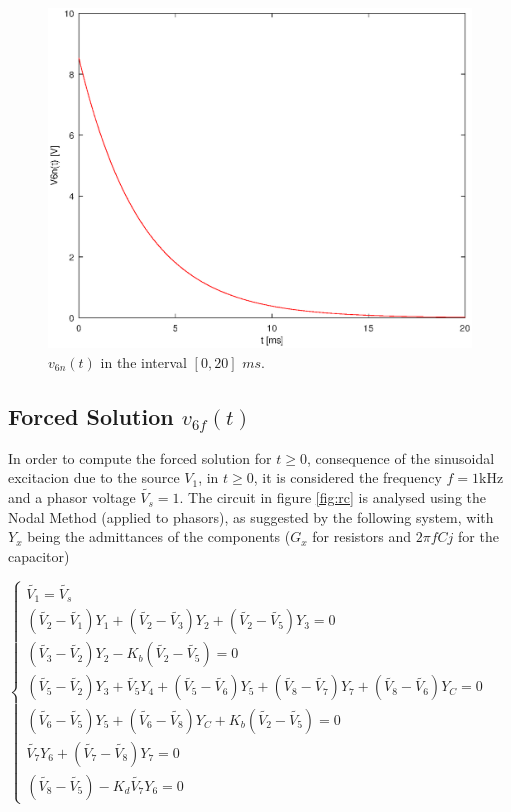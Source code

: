 \begin{figure}[h]
     \centering
         \includegraphics[scale = 0.7]{v6n.eps}
         \caption{$v_{6n}(t)$ in the interval $[0, 20]$ $ms$.}
     \label{v6n}
 \end{figure}
 \vspace{5mm}


\subsection{Forced Solution $v_{6f}(t)$}
In order to compute the forced solution for $t\geq0$, consequence of the sinusoidal excitacion due to the source $V_1$, in $t\geq0$, it is considered the frequency $f=1$kHz and a phasor voltage $\widetilde{V_s}=1$. The circuit in figure \ref{fig:rc} is analysed using the Nodal Method (applied to phasors), as suggested by the following system, with $Y_x$ being the admittances of the components ($G_x$ for resistors and $2\pi fCj$ for the capacitor)


\begin{center}
  $\begin{cases} \widetilde{V_1}= \widetilde{V_s} \\ (\widetilde{V_2}-\widetilde{V_1})Y_1 + (\widetilde{V_2}-\widetilde{V_3})Y_2 + (\widetilde{V_2}-\widetilde{V_5})Y_3=0 \\  (\widetilde{V_3}-\widetilde{V_2})Y_2 -K_b(\widetilde{V_2}-\widetilde{V_5})=0 \\ (\widetilde{V_5}-\widetilde{V_2})Y_3 + \widetilde{V_5}Y_4 + (\widetilde{V_5}-\widetilde{V_6})Y_5 + (\widetilde{V_8}-\widetilde{V_7})Y_7 + (\widetilde{V_8}-\widetilde{V_6})Y_C=0 \\ (\widetilde{V_6}-\widetilde{V_5})Y_5 + (\widetilde{V_6}-\widetilde{V_8})Y_C + K_b(\widetilde{V_2}-\widetilde{V_5})=0 \\ \widetilde{V_7}Y_6 + (\widetilde{V_7}-\widetilde{V_8})Y_7 =0 \\ (\widetilde{V_8}-\widetilde{V_5}) - K_d\widetilde{V_7}Y_6=0 \end{cases}$
\end{center}


